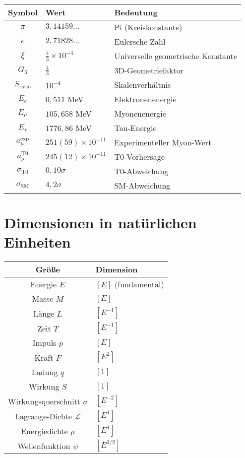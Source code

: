 \documentclass[12pt,a4paper]{report}
\begin{document}
	\begin{longtable}{|c|l|l|}
		\hline
		\textbf{Symbol} & \textbf{Wert} & \textbf{Bedeutung} \\
		\hline
		$\pi$ & $3,14159...$ & Pi (Kreiskonstante) \\
		$e$ & $2,71828...$ & Eulersche Zahl \\
		$\xi$ & $\frac{4}{3} \times 10^{-4}$ & Universelle geometrische Konstante \\
		$G_3$ & $\frac{4}{3}$ & 3D-Geometriefaktor \\
		$S_{\text{ratio}}$ & $10^{-4}$ & Skalenverhältnis \\
		$E_e$ & $0,511$ MeV & Elektronenenergie \\
		$E_\mu$ & $105,658$ MeV & Myonenenergie \\
		$E_\tau$ & $1776,86$ MeV & Tau-Energie \\
		$a_\mu^{\text{exp}}$ & $251(59) \times 10^{-11}$ & Experimenteller Myon-Wert \\
		$a_\mu^{\text{T0}}$ & $245(12) \times 10^{-11}$ & T0-Vorhersage \\
		$\sigma_{\text{T0}}$ & $0,10\sigma$ & T0-Abweichung \\
		$\sigma_{\text{SM}}$ & $4,2\sigma$ & SM-Abweichung \\
		\hline
	\end{longtable}
	
	\section{Dimensionen in natürlichen Einheiten}
	\label{sec:dimensions_natural_units}
	
	\begin{longtable}{|c|l|}
		\hline
		\textbf{Größe} & \textbf{Dimension} \\
		\hline
		Energie $E$ & $[E]$ (fundamental) \\
		Masse $M$ & $[E]$ \\
		Länge $L$ & $[E^{-1}]$ \\
		Zeit $T$ & $[E^{-1}]$ \\
		Impuls $p$ & $[E]$ \\
		Kraft $F$ & $[E^2]$ \\
		Ladung $q$ & $[1]$ \\
		Wirkung $S$ & $[1]$ \\
		Wirkungsquerschnitt $\sigma$ & $[E^{-2}]$ \\
		Lagrange-Dichte $\mathcal{L}$ & $[E^4]$ \\
		Energiedichte $\rho$ & $[E^4]$ \\
		Wellenfunktion $\psi$ & $[E^{3/2}]$ \\
		\hline
	\end{longtable}
	
\end{document}
